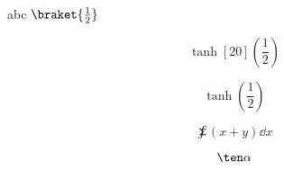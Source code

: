 
abc $\braket{\frac{1}{2}}$

\begin{equation}
\tanh[20](\frac12)
\end{equation}

\begin{equation}
\tanh(\frac12)
\end{equation}

\begin{equation}
\sumint (x + y) \dd{x}
\end{equation}

\begin{equation}
\ten \alpha
\end{equation}
